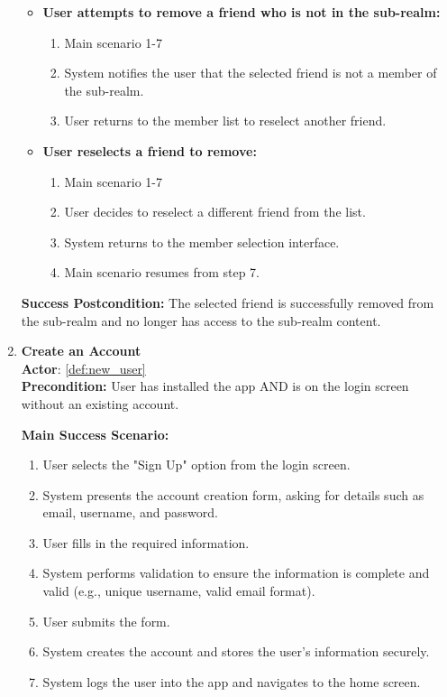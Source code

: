 \documentclass{article}
\begin{document}
\begin{enumerate}[label=\textbf{UC\arabic*}]
\begin{itemize}
            \item[{}] \textbf{User attempts to remove a friend who is not in the sub-realm:}
            \begin{enumerate}[label=\textbf{\arabic*.}]
                \item Main scenario 1-7
                \item System notifies the user that the selected friend is not a member of the sub-realm.
                \item User returns to the member list to reselect another friend.
            \end{enumerate}
            
            \item[{}] \textbf{User reselects a friend to remove:}
            \begin{enumerate}[label=\textbf{\arabic*.}]
                \item Main scenario 1-7
                \item User decides to reselect a different friend from the list.
                \item System returns to the member selection interface.
                \item Main scenario resumes from step 7.
            \end{enumerate}
        \end{itemize}
        
        \textbf{Success Postcondition:} The selected friend is successfully removed from the sub-realm and no longer has access to the sub-realm content.

    \item \label{uc:23} \textbf{Create an Account} \\
        \textbf{Actor}: \ref{def:new_user} \\
        \textbf{Precondition:} User has installed the app AND is on the login screen without an existing account.
    
        \textbf{Main Success Scenario:}
        \begin{enumerate}[label=\textbf{\arabic*.}]
            \item User selects the "Sign Up" option from the login screen.
            \item System presents the account creation form, asking for details such as email, username, and password.
            \item User fills in the required information.
            \item System performs validation to ensure the information is complete and valid (e.g., unique username, valid email format).
            \item User submits the form.
            \item System creates the account and stores the user’s information securely.
            \item System logs the user into the app and navigates to the home screen.
        \end{enumerate}
        

\end{enumerate}
\end{document}
